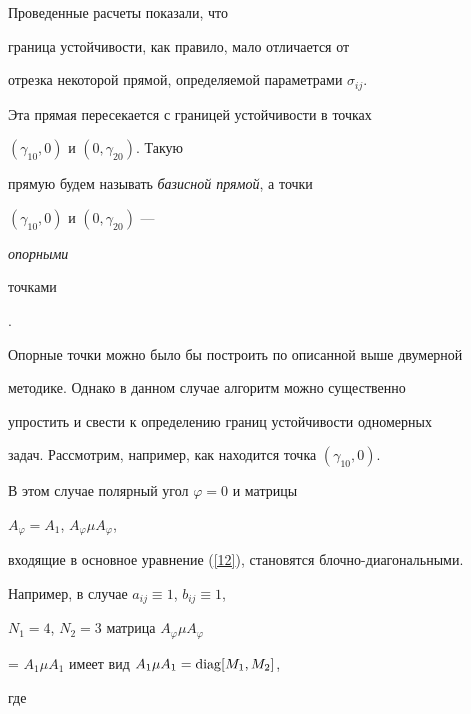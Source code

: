 Проведенные расчеты показали, что


граница устойчивости, как правило, мало отличается от


отрезка некоторой прямой, определяемой параметрами $\sigma_{ij}$.


Эта прямая пересекается с границей устойчивости в точках


$(\gamma_{10},0)$ и $(0,\gamma_{20})$. Такую


прямую будем называть {\it базисной прямой}, а точки


$(\gamma_{10},0)$ и $(0,\gamma_{20})$ --- {\it опорными


точками}.





Опорные точки можно было бы построить по описанной выше двумерной


методике. Однако в данном случае алгоритм можно существенно


упростить и свести к определению границ устойчивости одномерных


задач. Рассмотрим, например, как находится точка $(\gamma_{10},0)$.


В этом случае полярный угол $\varphi=0$ и матрицы


$A_{\varphi}=A_{1}$, $A_{\varphi}\mu A_{\varphi}$,


входящие в основное уравнение (\ref{12}), становятся блочно-диагональными.


Например, в случае $a_{ij} \equiv 1$, $b_{ij} \equiv 1$,


$N_1=4$, $N_2=3$ матрица $A_{\varphi}\mu A_{\varphi}$


= $A_{1}\mu A_{1}$ имеет вид $A_{1}\mu A_{1}=\operatorname{diag} [M_1,M_2]$,


где


